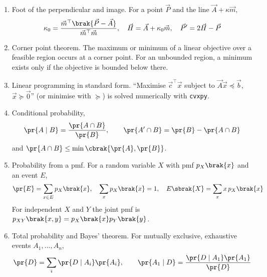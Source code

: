 \begin{enumerate}[label=\thesubsection.\arabic*, ref=\thesubsection.\theenumi]
\item Foot of the perpendicular and image. For a point $\vec{P}$ and the line $\vec{A} + \kappa\vec{m}$,
\begin{align}
	\kappa_0 = \frac{\vec{m}^{\top}\brak{\vec{P}-\vec{A}}}{\vec{m}^{\top}\vec{m}}, \quad \vec{H} = \vec{A} + \kappa_0\vec{m}, \quad \vec{P}^{\prime} = 2\vec{H} - \vec{P} \label{eq:CBSE12-image}
\end{align}
\item Corner point theorem. The maximum or minimum of a linear objective over a feasible region occurs at a corner point. For an unbounded region, a minimum exists only if the objective is bounded below there. 
\item Linear programming in standard form. ``Maximise $\vec{c}^{\top}\vec{x}$ subject to $\vec{A}\vec{x} \preceq \vec{b}$, $\vec{x} \succeq \vec{0}$'' (or minimise with $\succeq$) is solved numerically with \texttt{cvxpy}.
\item Conditional probability,
\begin{align}
	\pr{A\mid B} = \frac{\pr{A\cap B}}{\pr{B}}, \qquad \pr{A^{\prime}\cap B} = \pr{B} - \pr{A\cap B} \label{eq:CBSE12-cond}
\end{align}
and $\pr{A\cap B} \le \min\cbrak{\pr{A},\pr{B}}$. 
\item Probability from a pmf. For a random variable $X$ with pmf $p_X\brak{x}$ and an event $E$,
\begin{align}
	\pr{E} = \sum_{x \in E} p_X\brak{x}, \quad \sum_x p_X\brak{x} = 1, \quad E\sbrak{X} = \sum_x x\,p_X\brak{x} \label{eq:CBSE12-pmf}
\end{align}
For independent $X$ and $Y$ the joint pmf is $p_{XY}\brak{x,y} = p_X\brak{x}p_Y\brak{y}$.
\item Total probability and Bayes' theorem. For mutually exclusive, exhaustive events $A_1, \dots, A_n$,
\begin{align}
	\pr{D} = \sum_i \pr{D\mid A_i}\pr{A_i}, \qquad
	\pr{A_1\mid D} = \frac{\pr{D\mid A_1}\pr{A_1}}{\pr{D}} \label{eq:CBSE12-bayes}
\end{align}
\end{enumerate}
